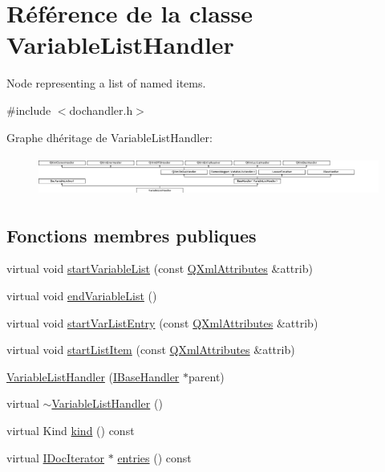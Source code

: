 \hypertarget{class_variable_list_handler}{}\section{Référence de la classe Variable\+List\+Handler}
\label{class_variable_list_handler}


Node representing a list of named items.  




{\ttfamily \#include $<$dochandler.\+h$>$}

Graphe d\textquotesingle{}héritage de Variable\+List\+Handler\+:\begin{figure}[H]
\begin{center}
\leavevmode
\includegraphics[height=1.311475cm]{class_variable_list_handler}
\end{center}
\end{figure}
\subsection*{Fonctions membres publiques}
\begin{DoxyCompactItemize}
\item 
virtual void \hyperlink{class_variable_list_handler_a523965fbe03792f499c4a70ff56ff154}{start\+Variable\+List} (const \hyperlink{class_q_xml_attributes}{Q\+Xml\+Attributes} \&attrib)
\item 
virtual void \hyperlink{class_variable_list_handler_a32f854c7ccf227941bf0de629e9fa3eb}{end\+Variable\+List} ()
\item 
virtual void \hyperlink{class_variable_list_handler_aeaba3b6193c383a56b267aa434319b7b}{start\+Var\+List\+Entry} (const \hyperlink{class_q_xml_attributes}{Q\+Xml\+Attributes} \&attrib)
\item 
virtual void \hyperlink{class_variable_list_handler_a041c0bb4ece0e231cc9f0fadc7012613}{start\+List\+Item} (const \hyperlink{class_q_xml_attributes}{Q\+Xml\+Attributes} \&attrib)
\item 
\hyperlink{class_variable_list_handler_aa23a7af1c77a52ad2b873b5273988a5b}{Variable\+List\+Handler} (\hyperlink{class_i_base_handler}{I\+Base\+Handler} $\ast$parent)
\item 
virtual \hyperlink{class_variable_list_handler_af433f2053889aace1fbdfa6a4e3aff18}{$\sim$\+Variable\+List\+Handler} ()
\item 
virtual Kind \hyperlink{class_variable_list_handler_aa7c127bc1ae918839fb4f50719d5ffee}{kind} () const 
\item 
virtual \hyperlink{class_i_doc_iterator}{I\+Doc\+Iterator} $\ast$ \hyperlink{class_variable_list_handler_a9b533f6a952a0367aa6b81d8e176e9c0}{entries} () const 
\end{DoxyCompactItemize}
